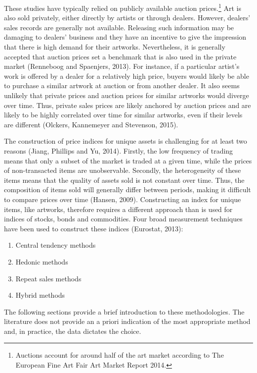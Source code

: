 \documentclass[12pt,]{article}
\providecommand{\tightlist}{%
  \setlength{\itemsep}{0pt}\setlength{\parskip}{0pt}}
\let\rmarkdownfootnote\footnote%
\def\footnote{\protect\rmarkdownfootnote}
\begin{document}
These studies have typically relied on publicly available auction
prices.\footnote{Auctions account for around half of the art market
  according to The European Fine Art Fair Art Market Report 2014.} Art
is also sold privately, either directly by artists or through dealers.
However, dealers' sales records are generally not available. Releasing
such information may be damaging to dealers' business and they have an
incentive to give the impression that there is high demand for their
artworks. Nevertheless, it is generally accepted that auction prices set
a benchmark that is also used in the private market (Renneboog and
Spaenjers, 2013). For instance, if a particular artist's work is offered
by a dealer for a relatively high price, buyers would likely be able to
purchase a similar artwork at auction or from another dealer. It also
seems unlikely that private prices and auction prices for similar
artworks would diverge over time. Thus, private sales prices are likely
anchored by auction prices and are likely to be highly correlated over
time for similar artworks, even if their levels are different (Olckers,
Kannemeyer and Stevenson, 2015).

The construction of price indices for unique assets is challenging for
at least two reasons (Jiang, Phillips and Yu, 2014). Firstly, the low
frequency of trading means that only a subset of the market is traded at
a given time, while the prices of non-transacted items are unobservable.
Secondly, the heterogeneity of these items means that the quality of
assets sold is not constant over time. Thus, the composition of items
sold will generally differ between periods, making it difficult to
compare prices over time (Hansen, 2009). Constructing an index for
unique items, like artworks, therefore requires a different approach
than is used for indices of stocks, bonds and commodities. Four broad
measurement techniques have been used to construct these indices
(Eurostat, 2013):

\begin{enumerate}
\def\labelenumi{\alph{enumi})}
\tightlist
\item
  Central tendency methods
\item
  Hedonic methods
\item
  Repeat sales methods
\item
  Hybrid methods
\end{enumerate}

The following sections provide a brief introduction to these
methodologies. The literature does not provide an a priori indication of
the most appropriate method and, in practice, the data dictates the
choice.
\end{document}
